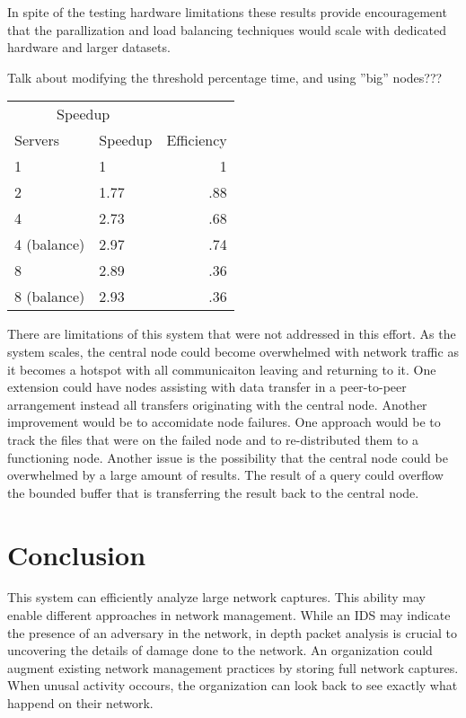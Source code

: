 \documentclass{article}
\begin{document}
\begin{multicols}{2}
In spite of the testing hardware limitations these results provide encouragement that the parallization and load balancing techniques would scale with dedicated hardware and larger datasets.


Talk about modifying the threshold percentage time, and using ''big'' nodes???


\begin{tabular}{llr}
\hline
\multicolumn{2}{c}{Speedup} \\
\cline{1-2}
Servers    & Speedup & Efficiency  \\
\hline
1     &  1  & 1   \\
2     &   1.77  & .88  \\
4     &   2.73  & .68 \\
4 (balance) & 2.97 & .74     \\
8 &  2.89   & .36  \\
8 (balance) & 2.93 & .36      \\
\hline
\end{tabular}


There are limitations of this system that were not addressed in this effort.  As the system scales, the central node could become overwhelmed with network traffic as it becomes a hotspot with all communicaiton leaving and returning to it. One extension could have nodes assisting with data transfer in a peer-to-peer arrangement instead all transfers originating with the central node.  Another improvement would be to accomidate node failures. One approach would be to track the files that were on the failed node and to re-distributed them to a functioning node.  Another issue is the possibility that the central node could be overwhelmed by a large amount of results. The result of a query could overflow the bounded buffer that is transferring the result back to the central node.   


\section*{Conclusion}

This system can efficiently analyze large network captures. This ability may enable different approaches in network management.  While an IDS may indicate the presence of an adversary in the network, in depth packet analysis is crucial to uncovering the details of damage done to the network.  An organization could augment existing network management practices by storing full network captures.  When unusal activity occours, the organization can look back to see exactly what happend on their network.  

\end{multicols}
\end{document}
